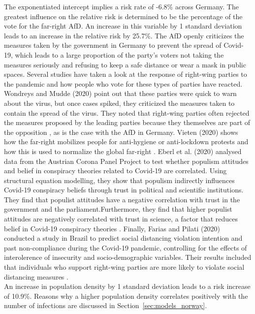 The exponentiated intercept implies a risk rate of -6.8\% across Germany. The greatest influence on the relative risk is determined to be the percentage of the vote for the far-right AfD. An increase in this variable by 1 standard deviation leads to an increase in the relative risk by 25.7\%. The AfD openly criticizes the measures taken by the government in Germany to prevent the spread of Covid-19, which leads to a large proportion of the party's voters not taking the measures seriously and refusing to keep a safe distance or wear a mask in public spaces. Several studies have taken a look at the response of right-wing parties to the pandemic and how people who vote for these types of parties have reacted. Wondreys and Mudde (2020) point out that these parties were quick to warn about the virus, but once cases spiked, they criticized the measures taken to contain the spread of the virus. They noted that right-wing parties often rejected the measures proposed by the leading parties because they themselves are part of the opposition \autocite[][]{wondreys2020victims}, as is the case with the AfD in Germany. Vieten (2020) shows how the far-right mobilizes people for anti-hygiene or anti-lockdown protests and how this is used to normalize the global far-right \autocite[][]{vieten2020new}. Eberl et al. (2020) analysed data from the Austrian Corona Panel Project to test whether populism attitudes and belief in conspiracy theories related to Covid-19 are correlated. Using structural equation modelling, they show that populism indirectly influences Covid-19 conspiracy beliefs through trust in political and scientific institutions. They find that populist attitudes have a negative correlation with trust in the government and the parliament.Furthermore, they find that higher populist attitudes are negatively correlated with trust in science, a factor that reduces belief in Covid-19 conspiracy theories \autocite[][]{eberl2020populism}. Finally, Farias and Pilati (2020) conducted a study in Brazil to predict social distancing violation intention and past non-compliance during the Covid-19 pandemic, controlling for the effects of interolerence of insecurity and socio-demographic variables. Their results included that individuals who support right-wing parties are more likely to violate social distancing measures \autocite[][]{farias2020violating}. \\
An increase in population density by 1 standard deviation leads to a risk increase of 10.9\%. Reasons why a higher population density correlates positively with the number of infections are discussed in Section~\ref{sec:models_norway}. \\
